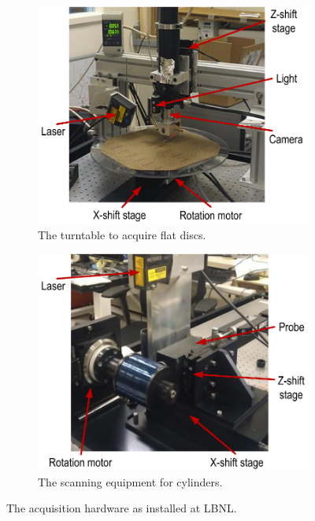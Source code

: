 \begin{figure}[!ht]
    \begin{subfigure}[b]{0.49\textwidth}
    \centering
    \includegraphics[width=\textwidth]{images/hardware-irene}
    \caption{The turntable to acquire flat discs.}
    \label{fig:labirene}
    \end{subfigure}
    \begin{subfigure}[b]{0.49\textwidth}
    \centering
    \includegraphics[width=\textwidth]{images/hardware-3d}
    \caption{The scanning equipment for cylinders.}
    \label{fig:lab3d}
    \end{subfigure}
    \caption{The acquisition hardware as installed at LBNL.}
    \label{fig:labhw}
\end{figure}

